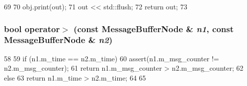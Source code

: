 \begin{DoxyCode}
69 {
70     obj.print(out);
71     out << std::flush;
72     return out;
73 }
\end{DoxyCode}
\hypertarget{MessageBufferNode_8hh_a903305019990d40c6303646dab4ce7af}{
\subsubsection[{operator$>$}]{\setlength{\rightskip}{0pt plus 5cm}bool operator$>$ (const {\bf MessageBufferNode} \& {\em n1}, \/  const {\bf MessageBufferNode} \& {\em n2})}}
\label{MessageBufferNode_8hh_a903305019990d40c6303646dab4ce7af}



\begin{DoxyCode}
58 {
59     if (n1.m_time == n2.m_time) {
60         assert(n1.m_msg_counter != n2.m_msg_counter);
61         return n1.m_msg_counter > n2.m_msg_counter;
62     } else {
63         return n1.m_time > n2.m_time;
64     }
65 }
\end{DoxyCode}
